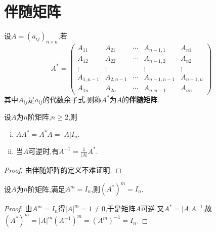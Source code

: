 \documentclass[../../main.tex]{subfiles}
\begin{document}
\section{伴随矩阵}

\begin{definition}[伴随矩阵定义]\label{definition:伴随矩阵定义}
设$A=(a_{ij})_{n\times n}$,若
\[
A^* = 
\begin{pmatrix}
A_{11} & A_{21} & \cdots & A_{n - 1,1} & A_{n1} \\
A_{12} & A_{22} & \cdots & A_{n - 1,2} & A_{n2} \\
\vdots & \vdots & & \vdots & \vdots \\
A_{1,n - 1} & A_{2,n - 1} & \cdots & A_{n - 1,n - 1} & A_{n - 1,n} \\
A_{1n} & A_{2n} & \cdots & A_{n,n - 1} & A_{nn}
\end{pmatrix}
\]
其中\(A_{ij}\)是\(a_{ij}\)的代数余子式.则称\(A^*\)为\(A\)的\textbf{伴随矩阵}.
\end{definition}

\begin{theorem}\label{theorem:伴随矩阵的基本性质}
设$A$为$n$阶矩阵,$n\geq 2$,则
\begin{enumerate}[(i)]
\item $AA^*=A^*A=\left| A \right|I_n$.
\item\label{伴随矩阵基本性质2} 当$A$可逆时,有$A^{-1}=\frac{1}{\left| A \right|}A^*$.
\end{enumerate}
\end{theorem}
\begin{proof}
由伴随矩阵的定义不难证明.
\end{proof}

\begin{proposition}
设\(A\)为\(n\)阶矩阵,满足\(A^m = I_n\),则\((A^*)^m = I_n\).
\end{proposition}
\begin{proof}
由\(A^m = I_n\)得\(|A|^m = 1\ne 0\),于是矩阵$A$可逆.又\(A^* = |A|A^{-1}\),故$(A^*)^m = |A|^m(A^{-1})^m = (A^m)^{-1} = I_n$.
\end{proof}
\end{document}

